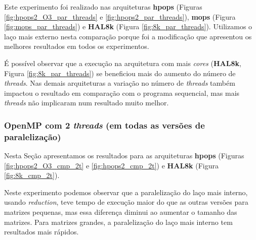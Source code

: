 \documentclass[a4paper, 12pt]{article}
\begin{document}
Este experimento foi realizado nas arquiteturas \textbf{hpops}
(Figuras \ref{fig:hpops2_O3_par_threads} e \ref{fig:hpops2_par_threads}),
\textbf{mops} (Figura \ref{fig:mops_par_threads}) e \textbf{HAL8k}
(Figura \ref{fig:8k_par_threads}). Utilizamos o laço mais externo
nesta comparação porque foi a modificação que apresentou os melhores
resultados em todos os experimentos.

É possível observar que a execução na arquitetura com mais \textit{cores}
(\textbf{HAL8k}, Figura \ref{fig:8k_par_threads}) se beneficiou mais
do aumento do número de \textit{threads}. Nas demais arquiteturas a
variação no número de \textit{threads} também impactou o resultado em
comparação com o programa sequencial, mas mais \textit{threads} não
implicaram num resultado muito melhor.

\subsubsection{OpenMP com 2 \textit{threads} (em todas as versões de paralelização)}

Nesta Seção apresentamos os resultados para as arquiteturas \textbf{hpops}
(Figuras \ref{fig:hpops2_O3_cmp_2t} e \ref{fig:hpops2_cmp_2t}) e \textbf{HAL8k}
(Figura \ref{fig:8k_cmp_2t}).

Neste experimento podemos observar que a paralelização do laço mais
interno, usando \textit{reduction}, teve tempo de execução maior
do que as outras versões para matrizes pequenas, mas essa diferença
diminui ao aumentar o tamanho das matrizes. Para matrizes grandes,
a paralelização do laço mais interno tem resultados mais rápidos.
\end{document}
